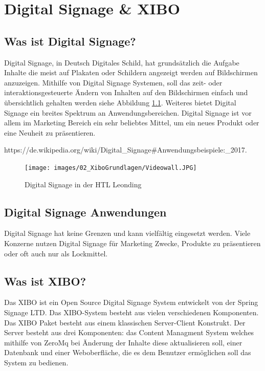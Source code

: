 \chapter{Digital Signage \& XIBO}
\section{Was ist Digital Signage?}\label{sec:digitalsignage}
Digital Signage, in Deutsch Digitales Schild, hat grundsätzlich die Aufgabe Inhalte die meist auf Plakaten oder Schildern angezeigt werden auf Bildschirmen anzuzeigen. Mithilfe von Digital Signage Systemen, soll das zeit- oder interaktionsgesteuerte Ändern von Inhalten auf den Bildschirmen einfach und übersichtlich gehalten werden siehe Abbildung \ref{img:digitalsignagehtlleonding}. Weiteres bietet Digital Signage ein breites Spektrum an Anwendungsbereichen. Digital Signage ist vor allem im Marketing Bereich ein sehr beliebtes Mittel, um ein neues Produkt oder eine Neuheit zu präsentieren. 

https://de.wikipedia.org/wiki/Digital_Signage#Anwendungsbeispiele:_2017.


\begin{figure}[H]
\centering
\texttt{[image: images/02\_XiboGrundlagen/Videowall.JPG]}
\caption{Digital Signage in der HTL Leonding}
\label{img:digitalsignagehtlleonding}
\end{figure}

\section{Digital Signage Anwendungen}\label{sec:anwendungedigitalsignage}
Digital Signage hat keine Grenzen und kann vielfältig eingesetzt werden. Viele Konzerne nutzen Digital Signage für Marketing Zwecke, Produkte zu präsentieren oder oft auch nur als Lockmittel.

\section{Was ist XIBO?}\label{sec:xibo}
Das XIBO ist ein Open Source Digital Signage System entwickelt von der Spring Signage LTD. Das XIBO-System besteht aus vielen verschiedenen Komponenten. Das XIBO Paket besteht aus einem klassischen Server-Client Konstrukt. Der Server besteht aus drei Komponenten: das Content Managment System welches mithilfe von ZeroMq bei Änderung der Inhalte diese aktualisieren soll, einer Datenbank und einer Weboberfläche, die es dem Benutzer ermöglichen soll das System zu bedienen.

